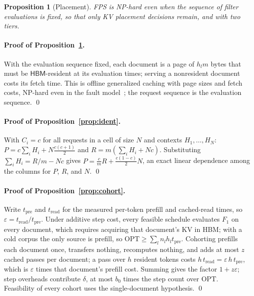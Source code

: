 \documentclass[10pt,twocolumn]{article}
\newtheorem{proposition}{Proposition}
\newcommand{\hbm}{\mathsf{HBM}}
\newcommand{\eps}{\varepsilon}
\begin{document}
\begin{proposition}[Placement]
\label{thm:caching}
FPS is NP-hard even when the sequence of filter evaluations is fixed, so that only KV placement decisions remain, and with two tiers.
\end{proposition}

\paragraph{Proof of Proposition~\ref{thm:caching}.}
With the evaluation sequence fixed, each document is a page of $h_l m$ bytes that must be $\hbm$-resident at its evaluation times; serving a nonresident document costs its fetch time. This is offline generalized caching with page sizes and fetch costs, NP-hard even in the fault model~\cite{cachinghard}; the request sequence is the evaluation sequence. \qed

\paragraph{Proof of Proposition~\ref{prop:ident}.}
With $C_i = c$ for all requests in a cell of size $N$ and contexts $H_1,\dots,H_N$: $P = c\sum_i H_i + N\frac{c(c+1)}{2}$ and $R = m(\sum_i H_i + Nc)$. Substituting $\sum_i H_i = R/m - Nc$ gives $P = \frac{c}{m}R + \frac{c(1-c)}{2}N$, an exact linear dependence among the columns for $P$, $R$, and $N$. \qed

\paragraph{Proof of Proposition~\ref{prop:cohort}.}
Write $t_{\mathrm{pre}}$ and $t_{\mathrm{read}}$ for the measured per-token prefill and cached-read times, so $\eps = t_{\mathrm{read}}/t_{\mathrm{pre}}$. Under additive step cost, every feasible schedule evaluates $F_1$ on every document, which requires acquiring that document's KV in HBM; with a cold corpus the only source is prefill, so $\mathrm{OPT} \ge \sum_l n_l h_l t_{\mathrm{pre}}$. Cohorting prefills each document once, transfers nothing, recomputes nothing, and adds at most $z$ cached passes per document; a pass over $h$ resident tokens costs $h\, t_{\mathrm{read}} = \eps\, h\, t_{\mathrm{pre}}$, which is $\eps$ times that document's prefill cost. Summing gives the factor $1 + z\eps$; step overheads contribute $\delta$, at most $b_0$ times the step count over $\mathrm{OPT}$. Feasibility of every cohort uses the single-document hypothesis. \qed
\end{document}
